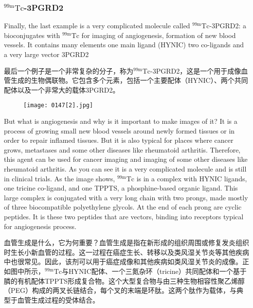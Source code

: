 \documentclass[dvipsnames, svgnames,a4paper,11pt]{article}
\begin{document}
\subsubsection{${}^\mathrm{99m}\mathrm{Tc}$-3PGRD2}
Finally, the last example is a very complicated molecule called ${}^\mathrm{99m}\mathrm{Tc}$-3PGRD2: a
bioconjugates with ${}^\mathrm{99m}\mathrm{Tc}$ for imaging of angiogenesis, formation of new blood
vessels. It contains many elements one main ligand (HYNIC) two co-ligands and a
very large vector 3PGRD2

最后一个例子是一个非常复杂的分子，称为${}^\mathrm{99m}\mathrm{Tc}$-3PGRD2，这是一个用于成像血管生成的生物偶联物。它包含多个元素，包括一个主要配体（HYNIC）、两个共同配体以及一个非常大的载体3PGRD2。

\begin{figure}[h]
	\centering
    \texttt{[image: 0147[2].jpg]}    
     \label{fig158}
\end{figure}

But what is angiogenesis and why is it important to make images of it? It is a process
of growing small new blood vessels around newly formed tissues or in order to repair  inflamed tissues. But it is also typical for places where cancer grows, metastases
and some other diseases like rheumatoid arthritis. Therefore, this agent can be used
for cancer imaging and imaging of some other diseases like rheumatoid arthritis. As
you can see it is a very complicated molecule and is still in clinical trials. As the
image shows, ${}^\mathrm{99m}\mathrm{Tc}$ is in a complex with HYNIC ligands, one tricine co-ligand, and
one TPPTS, a phosphine-based organic ligand. This large complex is conjugated
with a very long chain with two prongs, made mostly of three biocompatible
polyethylene glycols. At the end of each prong are cyclic peptides. It is these two
peptides that are vectors, binding into receptors typical for angiogenesis process.

血管生成是什么，它为何重要？血管生成是指在新形成的组织周围或修复发炎组织时生长小新血管的过程。这一过程在癌症生长、转移以及类风湿关节炎等其他疾病中也很常见。因此，该剂可以用于癌症成像和其他疾病如类风湿关节炎的成像。正如图中所示，${}^\mathrm{99m}\mathrm{Tc}$与HYNIC配体、一个三氮杂环（tricine）共同配体和一个基于膦的有机配体TPPTS形成复合物。这个大型复合物与由三种生物相容性聚乙烯醇（PEG）构成的两叉长链结合，每个叉的末端是环肽。这两个肽作为载体，与典型于血管生成过程的受体结合。
\end{document}
